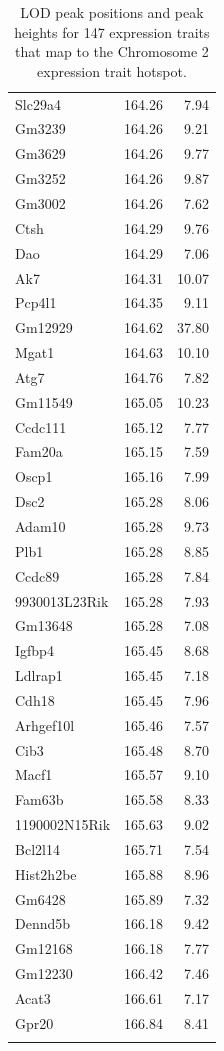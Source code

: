 \documentclass{article}
\begin{document}
\begin{boehm}
\begin{longtable}{lrr}
  Slc29a4 & 164.26 & 7.94 \\
  Gm3239 & 164.26 & 9.21 \\
  Gm3629 & 164.26 & 9.77 \\
  Gm3252 & 164.26 & 9.87 \\
  Gm3002 & 164.26 & 7.62 \\
  Ctsh & 164.29 & 9.76 \\
  Dao & 164.29 & 7.06 \\
  Ak7 & 164.31 & 10.07 \\
  Pcp4l1 & 164.35 & 9.11 \\
  Gm12929 & 164.62 & 37.80 \\
  Mgat1 & 164.63 & 10.10 \\
  Atg7 & 164.76 & 7.82 \\
  Gm11549 & 165.05 & 10.23 \\
  Ccdc111 & 165.12 & 7.77 \\
  Fam20a & 165.15 & 7.59 \\
  Oscp1 & 165.16 & 7.99 \\
  Dsc2 & 165.28 & 8.06 \\
  Adam10 & 165.28 & 9.73 \\
  Plb1 & 165.28 & 8.85 \\
  Ccdc89 & 165.28 & 7.84 \\
  9930013L23Rik & 165.28 & 7.93 \\
  Gm13648 & 165.28 & 7.08 \\
  Igfbp4 & 165.45 & 8.68 \\
  Ldlrap1 & 165.45 & 7.18 \\
  Cdh18 & 165.45 & 7.96 \\
  Arhgef10l & 165.46 & 7.57 \\
  Cib3 & 165.48 & 8.70 \\
  Macf1 & 165.57 & 9.10 \\
  Fam63b & 165.58 & 8.33 \\
  1190002N15Rik & 165.63 & 9.02 \\
  Bcl2l14 & 165.71 & 7.54 \\
  Hist2h2be & 165.88 & 8.96 \\
  Gm6428 & 165.89 & 7.32 \\
  Dennd5b & 166.18 & 9.42 \\
  Gm12168 & 166.18 & 7.77 \\
  Gm12230 & 166.42 & 7.46 \\
  Acat3 & 166.61 & 7.17 \\
  Gpr20 & 166.84 & 8.41 \\
   \hline
  \caption{LOD peak positions and peak heights for 147 expression traits that map to the Chromosome 2 expression trait hotspot.}
  \label{tab:hot-annot}

\end{longtable}

\end{boehm}
\end{document}
